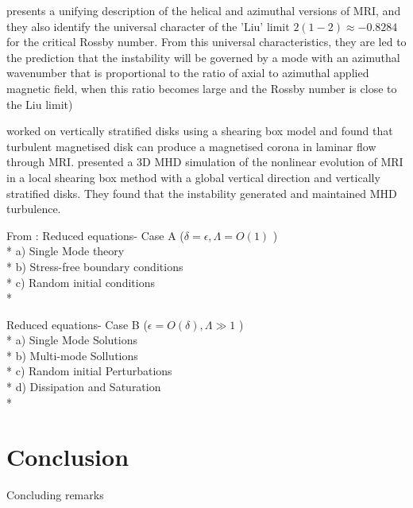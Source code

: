 \documentclass{jfm}
\begin{document}
\cite{Kirillov2012} presents a unifying description of the helical and
azimuthal versions of MRI, and they also identify the universal character of
the 'Liu' limit $2(1 - 2) \approx - 0.8284$ for the critical Rossby number.
From this universal characteristics, they are led to the prediction that the
instability will be governed by a mode with an azimuthal wavenumber that is
proportional to the ratio of axial to azimuthal applied magnetic field, when
this ratio becomes large and the Rossby number is close to the Liu limit)

\cite{Miller1999} worked on vertically stratified disks using a shearing box
model and found that turbulent magnetised disk can produce a magnetised corona
in laminar flow through MRI. \cite{Stone1996} presented a 3D MHD simulation of
the nonlinear evolution of MRI in a local shearing box method with a global
vertical direction and vertically stratified disks. They found that the
instability generated and maintained MHD turbulence.


From \cite{Julien2010}: Reduced equations- Case A ($ \delta = \epsilon, \Lambda = O(1) $ )\\*
 a) Single Mode theory \\*
 b) Stress-free boundary conditions \\*
 c) Random initial conditions \\*
 
 Reduced equations- Case B ($ \epsilon =O( \delta), \Lambda \gg 1 $ ) \\*
 a) Single Mode Solutions \\*
 b) Multi-mode Sollutions \\*
 c) Random initial Perturbations \\*
 d) Dissipation and Saturation \\*



\section{Conclusion}
Concluding remarks





\end{document}
